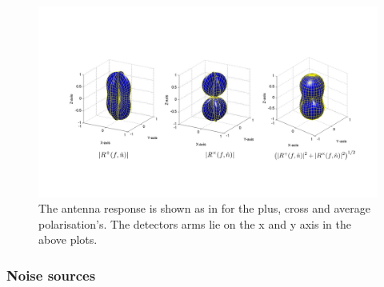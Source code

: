 \begin{figure}
    \centering
    \includegraphics[width=\textwidth]{C1_intro/LIGO_beam_patterns.png}
    \caption{The antenna response is shown as in \citep{romano2019SearchesStochastic} for the plus, cross and average polarisation's. The detectors arms lie on the x and y axis in the above plots. }
    \label{intro:detectors:response}
\end{figure}

\subsubsection{\label{intro:detector:noise}Noise sources}


